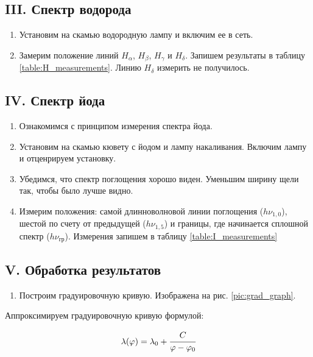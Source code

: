 \documentclass[a4paper,12pt]{article}
\begin{document}
\FloatBarrier
\clearpage

\subsection*{III. Спектр водорода}

\begin{enumerate}
    \item Установим на скамью водородную лампу и включим ее в сеть.
    \item Замерим положение линий $H_\alpha$, $H_\beta$, $H_\gamma$ и $H_\delta$. Запишем результаты в таблицу \ref{table:H_measurements}. Линию $H_\delta$ измерить не получилось.
\end{enumerate}


\subsection*{IV. Спектр йода}

\begin{enumerate}
    \item Ознакомимся с принципом измерения спектра йода.
    \item Установим на скамью кювету с йодом и лампу накаливания. Включим лампу и отценрируем установку.
    \item Убедимся, что спектр поглощения хорошо виден. Уменьшим ширину щели так, чтобы было лучше видно.
    \item Измерим положения: самой длинноволновой линии поглощения ($h \nu_{1,0}$), шестой по счету от предыдущей ($h \nu_{1,5}$) и границы, где начинается сплошной спектр ($h \nu_\text{гр}$). Измерения запишем в таблицу \ref{table:I_measurements}
\end{enumerate}

\subsection*{V. Обработка результатов}

\begin{enumerate}
    \item Построим градуировочную кривую. Изображена на рис. \ref{pic:grad_graph}.
\end{enumerate}

Аппроксимируем градуировочную кривую формулой:

\begin{equation*}
    \lambda (\varphi) = \lambda_0 + \cfrac{C}{\varphi - \varphi_0}
\end{equation*}
\end{document}
